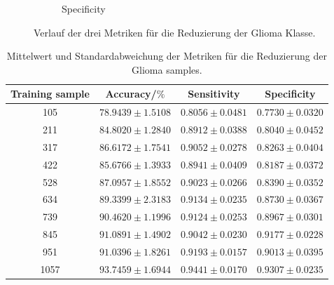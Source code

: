 \begin{figure}[H]
\begin{subfigure}[b]{0.48\textwidth}
    \caption{Specificity}
    \label{fig:gli-red-spec}
  \end{subfigure}
  \caption{Verlauf der drei Metriken für die Reduzierung der Glioma Klasse.}
  \label{fig:gli-men-gliored}
\end{figure}
\begin{table}[H]
    \centering
    {\small
        \begin{tabular}{cccc}
            \toprule
            Training sample & Accuracy/$\%$ & Sensitivity & Specificity\\
            \midrule
            105  & $78.9439 \pm 1.5108$ & $0.8056 \pm 0.0481$ & $0.7730 \pm 0.0320$ \\
            211  & $84.8020 \pm 1.2840$ & $0.8912 \pm 0.0388$ & $0.8040 \pm 0.0452$ \\
            317  & $86.6172 \pm 1.7541$ & $0.9052 \pm 0.0278$ & $0.8263 \pm 0.0404$ \\
            422  & $85.6766 \pm 1.3933$ & $0.8941 \pm 0.0409$ & $0.8187 \pm 0.0372$ \\
            528  & $87.0957 \pm 1.8552$ & $0.9023 \pm 0.0266$ & $0.8390 \pm 0.0352$ \\
            634  & $89.3399 \pm 2.3183$ & $0.9134 \pm 0.0235$ & $0.8730 \pm 0.0367$ \\
            739  & $90.4620 \pm 1.1996$ & $0.9124 \pm 0.0253$ & $0.8967 \pm 0.0301$ \\
            845  & $91.0891 \pm 1.4902$ & $0.9042 \pm 0.0230$ & $0.9177 \pm 0.0228$ \\
            951  & $91.0396 \pm 1.8261$ & $0.9193 \pm 0.0157$ & $0.9013 \pm 0.0395$ \\
            1057 & $93.7459 \pm 1.6944$ & $0.9441 \pm 0.0170$ & $0.9307 \pm 0.0235$ \\
            \bottomrule
        \end{tabular}}
  \caption{Mittelwert und Standardabweichung der Metriken für die Reduzierung der Glioma samples.}
  \label{tab:red-gli}
\end{table}

